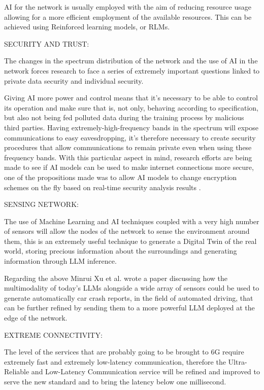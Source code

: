AI for the network is usually employed with the aim of reducing resource usage allowing for a
more efficient employment of the available resources. This can be achieved using Reinforced learning
models, or RLMs.

\bigskip
\noindent
SECURITY AND TRUST:
\label{ssec:security-trust}

The changes in the spectrum distribution of the network and the use of AI in the network forces
research to face a series of extremely important questions linked to private data security and
individual security.

Giving AI more power and control means that it's necessary to be able to
control its operation and make sure that is, not only, behaving according to specification, but also
not being fed polluted data during the training process by malicious third parties. Having
extremely-high-frequency bands in the spectrum will expose communications to easy
eavesdropping, it's therefore necessary to create security procedures that allow communications to
remain private even when using these frequency bands. With this particular aspect in mind, research
efforts are being made to see if AI models can be used to make internet connections more secure,
one of the propositions made was to allow AI models to change encryption schemes on the fly based on
real-time security analysis results \cite{6ainets}.

\bigskip
\noindent
SENSING NETWORK:
\label{ssec:sensing-network}

The use of Machine Learning and AI techniques coupled with a very high number of sensors will allow
the nodes of the network to sense the environment around them, this is an extremely useful technique
to generate a Digital Twin of the real world, storing precious information about the surroundings
and generating information through LLM inference.

Regarding the above Minrui Xu et al. \cite{pga} wrote a paper discussing how the multimodality of
today’s LLMs alongside a wide array of sensors could be used to generate automatically car crash
reports, in the field of automated driving, that can be further refined by sending them to a more
powerful LLM deployed at the edge of the network.

\bigskip
\noindent
EXTREME CONNECTIVITY:
\label{ssec:extreme-connectivity}

The level of the services that are probably going to be brought to 6G require extremely fast and
extremely low-latency communication, therefore the Ultra-Reliable and Low-Latency Communication
service will be refined and improved to serve the new standard and to bring the latency below one
millisecond.

